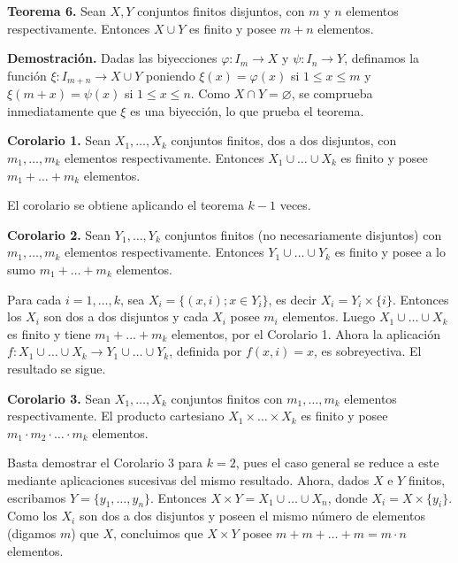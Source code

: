 \documentclass[12pt,oneside]{book}
\begin{document}
\textbf{Teorema 6.} Sean \( X, Y \) conjuntos finitos disjuntos, con \( m \) y \( n \) elementos respectivamente. Entonces \( X \cup Y \) es finito y posee \( m + n \) elementos.

\textbf{Demostración.} Dadas las biyecciones \( \varphi: I_m \to X \) y \( \psi: I_n \to Y \), definamos la función \( \xi: I_{m+n} \to X \cup Y \) poniendo \( \xi(x) = \varphi(x) \) si \( 1 \leq x \leq m \) y \( \xi(m + x) = \psi(x) \) si \( 1 \leq x \leq n \). Como \( X \cap Y = \varnothing \), se comprueba inmediatamente que \( \xi \) es una biyección, lo que prueba el teorema.

\textbf{Corolario 1.} Sean \( X_1, \dots, X_k \) conjuntos finitos, dos a dos disjuntos, con \( m_1, \dots, m_k \) elementos respectivamente. Entonces \( X_1 \cup \dots \cup X_k \) es finito y posee \( m_1 + \dots + m_k \) elementos.

El corolario se obtiene aplicando el teorema \( k-1 \) veces.

\textbf{Corolario 2.} Sean \( Y_1, \dots, Y_k \) conjuntos finitos (no necesariamente disjuntos) con \( m_1, \dots, m_k \) elementos respectivamente. Entonces \( Y_1 \cup \dots \cup Y_k \) es finito y posee a lo sumo \( m_1 + \dots + m_k \) elementos.

Para cada \( i = 1, \dots, k \), sea \( X_i = \{(x, i) ; x \in Y_i\} \), es decir \( X_i = Y_i \times \{i\} \). Entonces los \( X_i \) son dos a dos disjuntos y cada \( X_i \) posee \( m_i \) elementos. Luego \( X_1 \cup \dots \cup X_k \) es finito y tiene \( m_1 + \dots + m_k \) elementos, por el Corolario 1. Ahora la aplicación \( f: X_1 \cup \dots \cup X_k \to Y_1 \cup \dots \cup Y_k \), definida por \( f(x, i) = x \), es sobreyectiva. El resultado se sigue.

\textbf{Corolario 3.} Sean \( X_1, \dots, X_k \) conjuntos finitos con \( m_1, \dots, m_k \) elementos respectivamente. El producto cartesiano \( X_1 \times \dots \times X_k \) es finito y posee \( m_1 \cdot m_2 \cdot \dots \cdot m_k \) elementos.

Basta demostrar el Corolario 3 para \( k = 2 \), pues el caso general se reduce a este mediante aplicaciones sucesivas del mismo resultado. Ahora, dados \( X \) e \( Y \) finitos, escribamos \( Y = \{y_1, \dots, y_n\} \). Entonces \( X \times Y = X_1 \cup \dots \cup X_n \), donde \( X_i = X \times \{y_i\} \). Como los \( X_i \) son dos a dos disjuntos y poseen el mismo número de elementos (digamos \( m \)) que \( X \), concluimos que \( X \times Y \) posee \( m + m + \dots + m = m \cdot n \) elementos.
\end{document}
